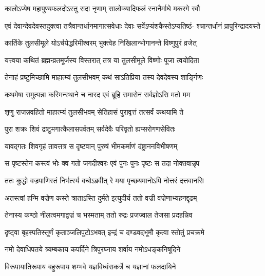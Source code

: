 \twolineshloka
{कालोऽप्येष महापुण्यफलदोऽस्तु सदा नृणाम्}
{सालोक्यादिफलं स्नानैर्माघे मकरगे रवौ} %

\fourlineindentedshloka
{एवं देवान्देवदेवस्तदुक्त्वा}
{तत्रैवान्तर्धानमागात्सवेधाः}
{देवाः सर्वेऽप्यंशकैस्तेऽप्यतिष्ठं-}
{श्चान्तर्धानं प्रापुरिन्द्रादयस्ते} %

\twolineshloka
{कार्तिके तुलसीमूले योऽर्चयेद्धरिमीश्वरम्}
{भुक्त्वेह निखिलान्भोगानन्ते विष्णुपुरं व्रजेत्} %





\twolineshloka
{यत्त्वया कथितं ब्रह्मन्व्रतमूर्जस्य विस्तरात्}
{तत्र या तुलसीमूले विष्णोः पूजा त्वयोदिता} %

\twolineshloka
{तेनाहं प्रष्टुमिच्छामि माहात्म्यं तुलसीभवम्}
{कथं साऽतिप्रिया तस्य देवदेवस्य शार्ङ्गिणः} %

\twolineshloka
{कथमेषा समुत्पन्ना कस्मिन्स्थाने च नारद}
{एवं ब्रूहि समासेन सर्वज्ञोऽसि मतो मम} %


\twolineshloka
{शृणु राजन्नवहितो माहात्म्यं तुलसीभवम्}
{सेतिहासं पुरावृत्तं तत्सर्वं कथयामि ते} %

\twolineshloka
{पुरा शक्रः शिवं द्रष्टुमगात्कैलासपर्वतम्}
{सर्वदेवैः परिवृतो ह्यप्सरोगणसेवितः} %

\twolineshloka
{यावद्गतः शिवगृहं तावत्तत्र स दृष्टवान्}
{पुरुषं भीमकर्माणं दंष्ट्राननविभीषणम्} %

\twolineshloka
{स पृष्टस्तेन कस्त्वं भोः क्व गतो जगदीश्वरः}
{एवं पुनः पुनः पृष्टः स तदा नोक्तवान्नृप} %

\twolineshloka
{ततः कुद्धो वज्रपाणिस्तं निर्भर्त्स्य वचोऽब्रवीत्}
{रे मया पृच्छयमानोऽपि नोत्तरं दत्तवानसि} %

\twolineshloka
{अतस्त्वां हन्मि वज्रेण कस्ते त्राताऽस्ति दुर्मते}
{इत्युदीर्य ततो वज्री वज्रेणाभ्यहनद्दृढम्} %

\twolineshloka
{तेनास्य कण्ठो नीलत्वमगाद्वज्रं च भस्मताम्}
{ततो रुद्रः प्रजज्वाल तेजसा प्रदहन्निव} %

\twolineshloka
{दृष्ट्वा बृहस्पतिस्तूर्णं कृताञ्जलिपुटोऽभवत्}
{इन्द्रं च दण्डवद्भूमौ कृत्वा स्तोतुं प्रचक्रमे} %


\twolineshloka
{नमो देवाधिपतये त्र्यम्बकाय कपर्दिने}
{त्रिपुरघ्नाय शर्वाय नमोऽधङ्कनिषूदिने} %

\twolineshloka
{विरूपायातिरूपाय बहुरूपाय शम्भवे}
{यज्ञविध्वंसकर्त्रे च यज्ञानां फलदायिने} %

